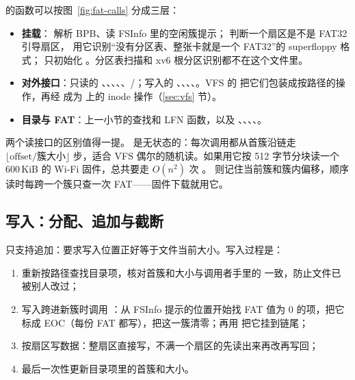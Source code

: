  的函数可以按图~\ref{fig:fat-calls} 分成三层：

\begin{itemize}
  \item \textbf{挂载}： 解析 BPB、读 FSInfo 里的空闲簇提示； 判断一个扇区是不是 FAT32 引导扇区， 用它识别“没有分区表、整张卡就是一个 FAT32”的 superfloppy 格式； 只初始化 。分区表扫描和 xv6 根分区识别都不在这个文件里。
  \item \textbf{对外接口}：只读的 、、、、、/；写入的 、、、、。VFS 的  把它们包装成按路径的操作，再经  成为  上的 inode 操作（\ref{sec:vfs} 节）。
  \item \textbf{目录与 FAT}：上一小节的查找和 LFN 函数，以及 、、、、。
\end{itemize}

两个读接口的区别值得一提。 是无状态的：每次调用都从首簇沿链走 $\lfloor\text{offset}/\text{簇大小}\rfloor$ 步，适合 VFS 偶尔的随机读。如果用它按 512 字节分块读一个 600\,KiB 的 Wi-Fi 固件，总共要走 $O(n^2)$ 次 。 则记住当前簇和簇内偏移，顺序读时每跨一个簇只查一次 FAT——固件下载就用它。

\subsection{写入：分配、追加与截断}

 只支持追加：要求写入位置正好等于文件当前大小。写入过程是：

\begin{enumerate}
  \item 重新按路径查找目录项，核对首簇和大小与调用者手里的  一致，防止文件已被别人改过；
  \item 写入跨进新簇时调用 ：从 FSInfo 提示的位置开始找 FAT 值为 0 的项，把它标成 EOC（每份 FAT 都写），把这一簇清零；再用  把它挂到链尾；
  \item 按扇区写数据：整扇区直接写，不满一个扇区的先读出来再改再写回；
  \item 最后一次性更新目录项里的首簇和大小。
\end{enumerate}

